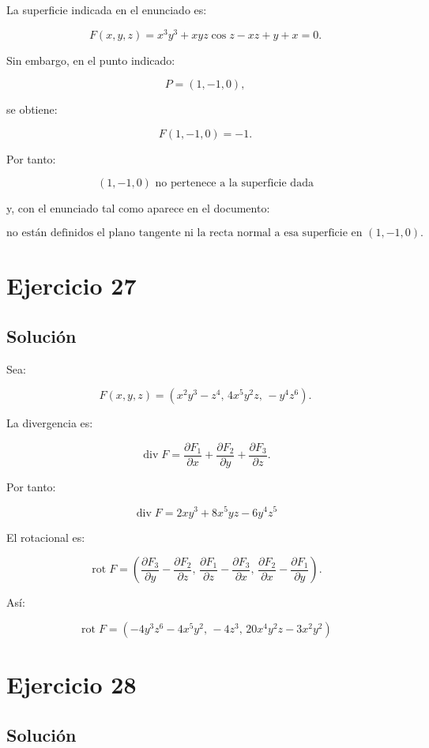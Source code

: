 \documentclass[11pt,a4paper]{article}
\newcommand{\diver}{\operatorname{div}}
\newcommand{\rot}{\operatorname{rot}}
\begin{document}
La superficie indicada en el enunciado es:

\[
F(x,y,z)
=
x^3y^3
+
xyz\cos z
-
xz
+
y
+
x
=
0.
\]

Sin embargo, en el punto indicado:

\[
P=(1,-1,0),
\]

se obtiene:

\[
F(1,-1,0)
=
-1.
\]

Por tanto:

\[
\boxed{
(1,-1,0)\text{ no pertenece a la superficie dada}
}
\]

y, con el enunciado tal como aparece en el documento:

\[
\boxed{
\text{no están definidos el plano tangente ni la recta normal a esa superficie en }(1,-1,0).
}
\]

\section{Ejercicio 27}
\subsection{Solución}

Sea:

\[
F(x,y,z)
=
\left(
x^2y^3-z^4,\,
4x^5y^2z,\,
-y^4z^6
\right).
\]

La divergencia es:

\[
\diver F
=
\frac{\partial F_1}{\partial x}
+
\frac{\partial F_2}{\partial y}
+
\frac{\partial F_3}{\partial z}.
\]

Por tanto:

\[
\boxed{
\diver F
=
2xy^3
+
8x^5yz
-
6y^4z^5
}
\]

El rotacional es:

\[
\rot F
=
\left(
\frac{\partial F_3}{\partial y}
-
\frac{\partial F_2}{\partial z},
\,
\frac{\partial F_1}{\partial z}
-
\frac{\partial F_3}{\partial x},
\,
\frac{\partial F_2}{\partial x}
-
\frac{\partial F_1}{\partial y}
\right).
\]

Así:

\[
\boxed{
\rot F
=
\left(
-4y^3z^6-4x^5y^2,\,
-4z^3,\,
20x^4y^2z-3x^2y^2
\right)
}
\]

\section{Ejercicio 28}
\subsection{Solución}
\end{document}

